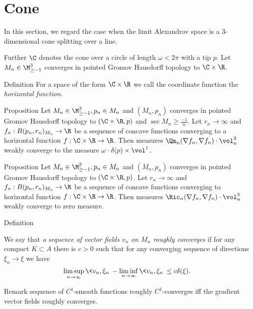 
\section{Cone}

In this section, we regard the case when the limit Alexandrov space
is a 3-dimensional cone splitting over a line.

Further $\C$ denotes the cone over a circle of length  $\omega<2\pi$
with a tip $p$.
Let $M_n\in\M_{\ge -1}^3$ converges in pointed
Gromov Hausdorff topology to $\C\times\R$.

\begin{thm}{Definition}
For a space of the form $\C\times\R$
we call the
coordinate function   
the \emph{horizontal function}. 
\end{thm}

\begin{thm}{Proposition}
Let $M_n\in\M_{\ge -1}^3, p_n\in M_n$ and $(M_n,p_n)$ converges in pointed
Gromov Hausdorff topology to $(\C\times\R, p)$
and $\operatorname{sec}M_n\ge\frac{-1}{n}$.
Let $r_n\to\infty$ and $f_n:B(p_n,r_n)_{M_n}\to \R$ be a sequence of concave
functions 
converging to a horizontal function $f:\C\times\R\to\R$.
Then measures $\Qm_n(\nabla f_n, \nabla f_n)\cdot\vol^3_n$
weakly converge to the measure $\omega\cdot\delta(p)\times \vol^1$.

\end{thm}

\begin{thm}{Proposition}
Let $M_n\in\M_{\ge -1}^3, p_n\in M_n$ and $(M_n,p_n)$ converges in pointed
Gromov Hausdorff topology to $(\C\times\R, p)$.
Let $r_n\to\infty$ and $f_n:B(p_n,r_n)_{M_n}\to \R$ be a sequence of concave
functions 
converging to horizontal function $f:\C\times\R\to\R$.
Then measures $\Ric_n(\nabla f_n, \nabla f_n)\cdot\vol^3_n$
weakly converge to zero measure.

\end{thm}



\begin{thm}{Definition}

We say that \textit{a sequence of vector fields $v_n$ on $M_n$ roughly converges}
if for any compact $K\subset A$ there is $c>0$ such that
for any converging sequence of directions $\xi_n\to\xi$
we have
$$\limsup_{n\to\infty} \<v_n,\xi_n\>-
 \liminf_{n\to\infty} \<v_n,\xi_n\>\le
 c\delta(\xi).
 $$
\end{thm}

\begin{thm}{Remark}
sequence of $C^1$-smooth functions roughly $C^1$-converges
iff the gradient vector fields
roughly converges.

\end{thm}


